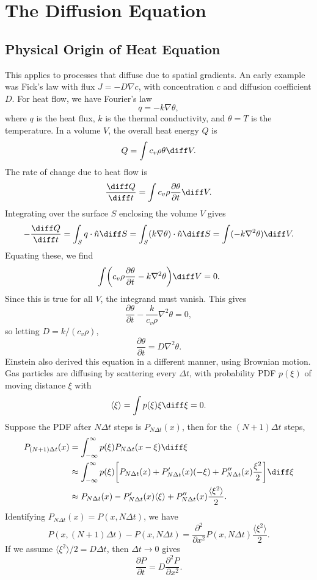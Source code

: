 \documentclass[12pt]{article}
\begin{document}
\newpage

\section{The Diffusion Equation}%
\label{sec:the_diffusion_equation}

\subsection{Physical Origin of Heat Equation}%
\label{sub:physical_origin_of_heat_equation}

This applies to processes that diffuse due to spatial gradients. An early example was Fick's law with flux $J = - D \nabla c$, with concentration $c$ and diffusion coefficient $D$. For heat flow, we have Fourier's law
\[
q = - k \nabla \theta
,\]
where $q$ is the heat flux, $k$ is the thermal conductivity, and $\theta = T$ is the temperature. In a volume $V$, the overall heat energy $Q$ is
\[
Q = \int c_v \rho \theta \diff V
.\]
The rate of change due to heat flow is
\[
\frac{\diff Q}{\diff t} = \int c_v \rho \frac{\partial \theta}{\partial t} \diff V
.\]
Integrating over the surface $S$ enclosing the volume $V$ gives
\[
	-\frac{\diff Q}{\diff t} = \int_{S} q \cdot \hat n \diff S = \int_{S}(k \nabla \theta) \cdot \hat n \diff S = \int (-k \nabla^2 \theta) \diff V
.\]
Equating these, we find
\[
	\int \biggl( c_v \rho \frac{\partial \theta}{\partial t} - k \nabla^2 \theta \biggr) \diff V = 0
.\]
Since this is true for all $V$, the integrand must vanish. This gives
\[
\frac{\partial \theta}{\partial t} - \frac{k}{c_v \rho} \nabla^2 \theta = 0
,\]
so letting $D = k/(c_v \rho)$,
\[
\frac{\partial \theta}{\partial t} = D \nabla^2 \theta
.\]
Einstein also derived this equation in a different manner, using Brownian motion. Gas particles are diffusing by scattering every $\Delta t$, with probability PDF $p(\xi)$ of moving distance $\xi$ with
\[
	\langle \xi \rangle = \int p(\xi) \xi \diff \xi = 0
.\]
Suppose the PDF after $N \Delta t$ steps is $P_{N \Delta t}(x)$, then for the $(N+1)\Delta t$ steps,
\begin{align*}
	P_{(N+1)\Delta t}(x) &= \int_{-\infty}^{\infty}p(\xi) P_{N \Delta t}(x - \xi) \diff \xi \\
			     &\approx \int_{-\infty}^{\infty}p(\xi) \biggl[ P_{N \Delta t}(x) + P_{N \Delta t}'(x)(-\xi) + P_{N \Delta t}''(x) \frac{\xi^2}{2} \biggr] \diff \xi \\
			     &\approx P_{N \Delta t}(x) - P_{N \Delta t}'(x)\langle \xi \rangle + P_{N \Delta t}''(x) \frac{\langle \xi^2 \rangle}{2}.
\end{align*}
Identifying $P_{N \Delta t}(x) = P(x, N \Delta t)$, we have
\[
	P(x, (N + 1) \Delta t) - P(x, N \Delta t) = \frac{\partial ^2}{\partial x^2} P(x, N \Delta t) \frac{\langle \xi^2 \rangle}{2}
.\]
If we assume $\langle \xi^2 \rangle/2 = D \Delta t$, then $\Delta t \to 0$ gives
\[
\frac{\partial P}{\partial t} = D \frac{\partial^2 P}{\partial x^2}
.\]
\end{document}
